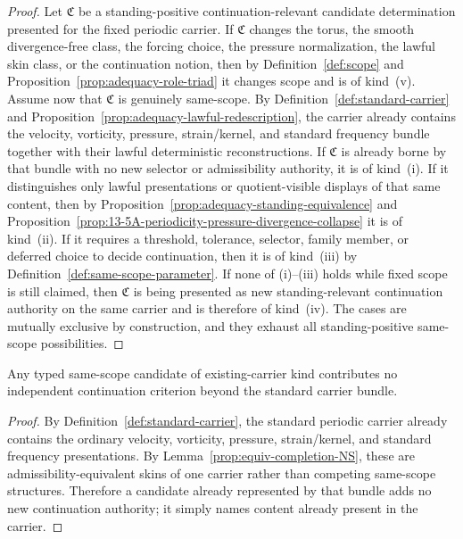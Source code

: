 \begin{proof}
Let $\mathfrak C$ be a standing-positive continuation-relevant candidate determination presented for the fixed periodic carrier.
If $\mathfrak C$ changes the torus, the smooth divergence-free class, the forcing choice, the
pressure normalization, the lawful skin class, or the continuation notion, then by
Definition~\ref{def:scope} and Proposition~\ref{prop:adequacy-role-triad} it changes scope and is of
kind~(v). Assume now that $\mathfrak C$ is genuinely same-scope. By
Definition~\ref{def:standard-carrier} and Proposition~\ref{prop:adequacy-lawful-redescription}, the
carrier already contains the velocity, vorticity, pressure, strain/kernel, and standard frequency
bundle together with their lawful deterministic reconstructions. If $\mathfrak C$ is already borne by
that bundle with no new selector or admissibility authority, it is of kind~(i). If it distinguishes
only lawful presentations or quotient-visible displays of that same content, then by
Proposition~\ref{prop:adequacy-standing-equivalence} and Proposition~\ref{prop:13-5A-periodicity-pressure-divergence-collapse}
it is of kind~(ii). If it requires a threshold, tolerance, selector, family member, or deferred
choice to decide continuation, then it is of kind~(iii) by Definition~\ref{def:same-scope-parameter}.
If none of (i)--(iii) holds while fixed scope is still claimed, then $\mathfrak C$ is being presented
as new standing-relevant continuation authority on the same carrier and is therefore of kind~(iv).
The cases are mutually exclusive by construction, and they exhaust all standing-positive same-scope possibilities.
\end{proof}

\begin{manualproposition}
\label{prop:13-5G-existing-carrier-content-adds-no-gate}
Any typed same-scope candidate of existing-carrier kind contributes no independent continuation
criterion beyond the standard carrier bundle.
\end{manualproposition}

\begin{proof}
By Definition~\ref{def:standard-carrier}, the standard periodic carrier already contains the ordinary
velocity, vorticity, pressure, strain/kernel, and standard frequency presentations. By
Lemma~\ref{prop:equiv-completion-NS}, these are admissibility-equivalent skins of one carrier rather
than competing same-scope structures. Therefore a candidate already represented by that bundle adds no
new continuation authority; it simply names content already present in the carrier.
\end{proof}

